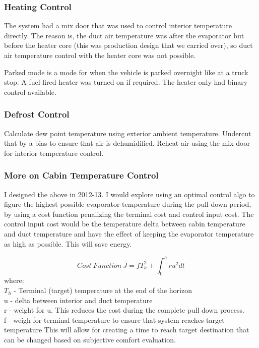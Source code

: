 \subsubsection * {Heating Control}
The system had a mix door that was used to control interior temperature directly. The reason is, the duct air temperature was after the evaporator but before the heater core (this was production design that we carried over), so duct air temperature control with the heater core was not possible.

Parked mode is a mode for when the vehicle is parked overnight like at a truck stop. A fuel-fired heater was turned on if required. The heater only had binary control available.

\subsubsection * {Defrost Control}
Calculate dew point temperature using exterior ambient temperature. Undercut that by a bias to ensure that air is dehumidified. Reheat air using the mix door for interior temperature control.

\subsubsection * {More on Cabin Temperature Control}
I designed the above in 2012-13. I would explore using an optimal control algo to figure the highest possible evaporator temperature during the pull down period, by using a cost function penalizing the terminal cost and control input cost. The control input cost would be the temperature delta between cabin temperature and duct temperature and have the effect of keeping the evaporator temperature as high as possible. This will save energy.

\begin{equation}
Cost \: Function \: J = fT_h^2 + \int_0^h ru^2dt
\end{equation}
where: \\
$T_h$ - Terminal (target) temperature at the end of the horizon \\
u - delta between interior and duct temperature \\
r - weight for u. This reduces the cost during the complete pull down process. \\
f - weigh for terminal temperature to ensure that system reaches target temperature
\noindent
\newline
\newline
This will allow for creating a time to reach target destination that can be changed based on subjective comfort evaluation.